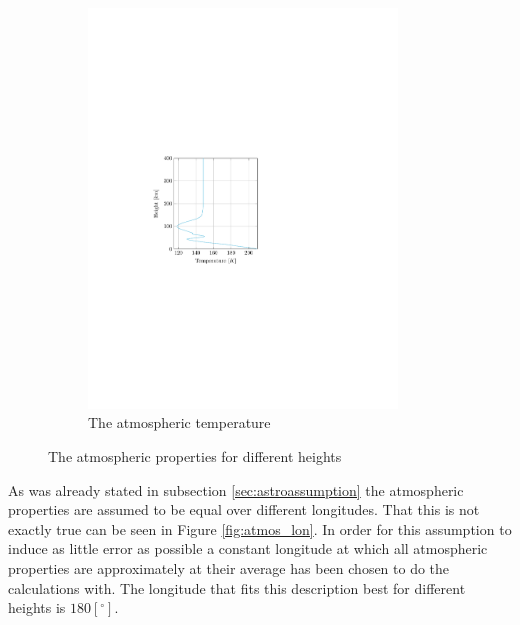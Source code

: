 \begin{figure}[ht!]
\begin{subfigure}{0.45\textwidth}
	\includegraphics[trim={4cm 9.8cm 9cm 10cm},clip,width=0.9\textwidth]{Figure/atmos_model/temperature.pdf}
	\caption{The atmospheric temperature}
	\label{fig:atmos_height_T}
	\end{subfigure}
	\caption{The atmospheric properties for different heights}
	\label{fig:atmos_height}
\end{figure}

As was already stated in subsection \ref{sec:astroassumption} the atmospheric properties are assumed to be equal over different longitudes. That this is not exactly true can be seen in Figure \ref{fig:atmos_lon}. In order for this assumption to induce as little error as possible a constant longitude at which all atmospheric properties are approximately at their average has been chosen to do the calculations with. The longitude that fits this description best for different heights is $180 \left[^\circ\right]$.

